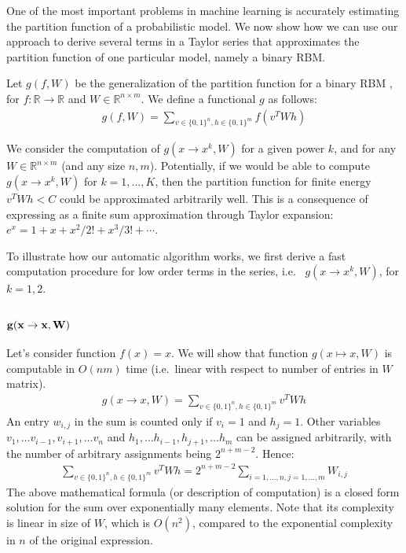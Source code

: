 One of the most important problems in machine learning is accurately
estimating the partition function of a probabilistic model. We now
show how we can use our approach to derive several terms in a Taylor
series that approximates the partition function of one particular
model, namely a binary RBM. 

Let $g(f, W)$ be the generalization of the partition function for a binary
RBM \cite{hinton2002training}, for $f: \mathbb{R} \rightarrow \mathbb{R}$ and $W \in \mathbb{R}^{n \times m}$.
We define a functional $g$ as follows: \\
\vspace{-0.3cm}
\begin{align*}
g(f, W) = \sum_{v \in \{0, 1\}^n, h \in \{0, 1\}^m} f(v^TWh)
\end{align*}
\vspace{-0.1cm}

We consider the computation of $g(x \rightarrow x^k, W)$ for a given power
$k$, and for any $W \in \mathbb{R}^{n \times m}$ (and any size $n, m$). Potentially, if we would be able
to compute $g(x \rightarrow x^k, W)$ for $k = 1, \dots, K$, then the partition
function for finite energy $v^TWh < C$ could be approximated arbitrarily well.
This is a consequence of expressing as a finite sum approximation through
Taylor expansion: $e^{x}=1+x+x^2/2!+x^3/3!+\cdots$.

To illustrate how our automatic algorithm works, we first derive a
fast computation procedure for low order terms in the series, i.e.~ $g(x
\rightarrow x^k, W)$, for $k = 1, 2$. 


\subsubsection{{$\bf g(x \rightarrow x, W)$}} \label{subsubsec:gx} Let's consider function $f(x) = x$. We
will show that function $g(x \mapsto x, W)$ is computable in $O(nm)$ time
(i.e.~linear with respect to number of entries in $W$ matrix).
\begin{gather*}
	g(x \rightarrow x, W) = \sum_{v \in \{0, 1\}^n, h \in \{0, 1\}^m} v^TWh
\end{gather*}
An entry $w_{i,j}$ in the sum is counted only if $v_i = 1$ and $h_j = 1$. Other variables
$v_1, \dots v_{i-1}, v_{i+1}, \dots v_n$ and $h_1, \dots h_{i-1}, h_{j+1}, \dots h_m$ can be 
assigned arbitrarily, with the number of arbitrary assignments being
$2^{n + m - 2}$. Hence:
\begin{gather*}
	\sum_{v \in \{0, 1\}^n, h \in \{0, 1\}^m} v^TWh = 2^{n + m - 2}\sum_{i = 1, \dots, n, j = 1, \dots, m} W_{i, j}
\end{gather*}
The above mathematical formula (or description of computation) is a
closed form solution for the sum over exponentially many
elements. Note that its complexity is linear in size of $W$, which is
$O(n^2)$, compared to the exponential complexity in $n$ of the
original expression.

